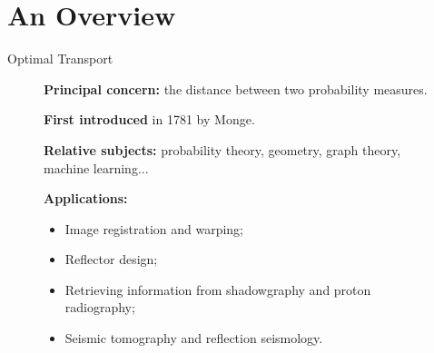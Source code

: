 \section{An Overview}

\begin{frame}{Optimal Transport}
    \scriptsize
    \vspace{-1.5em}
    \begin{figure}
        \captionsetup{font=tiny}
        \begin{minipage}[t]{0.6\linewidth}
            \vspace{0pt}
            \textbf{Principal concern:} the distance between two probability measures.

            \textbf{First introduced} in 1781 by Monge.

            \textbf{Relative subjects:} probability theory, geometry, graph theory, machine learning...

            \textbf{Applications:}
            \begin{itemize}
                \item Image registration and warping;
                \item Reflector design;
                \item Retrieving information from shadowgraphy and proton radiography;
                \item Seismic tomography and reflection seismology.
            \end{itemize}


\end{minipage}
\end{figure}
\end{frame}
